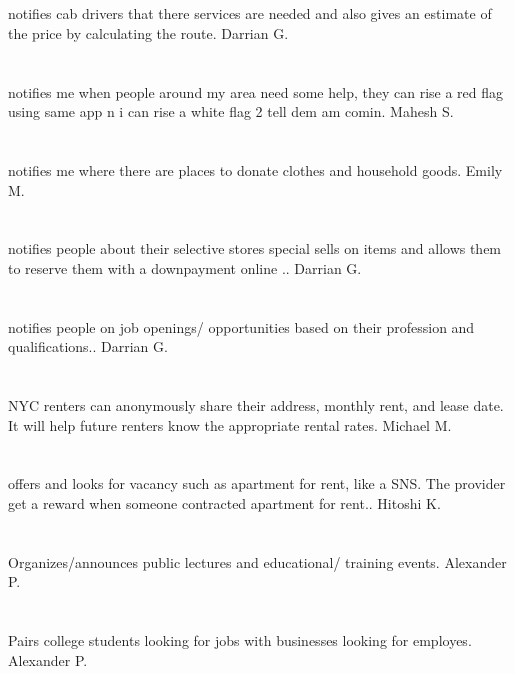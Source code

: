 \section{}notifies cab drivers that there services are needed and also gives an estimate of the price by calculating the route. Darrian G.
\section{}notifies me when people around my area need some help,  they can rise a red flag using same app n i can rise a white flag 2 tell dem am comin. Mahesh S.
\section{}notifies me where there are places to donate clothes and household goods. Emily M.
\section{}notifies people about their selective stores special sells on items and allows them to reserve them with a downpayment online .. Darrian G.
\section{}notifies people on job openings/ opportunities based on their profession and qualifications.. Darrian G.
\section{}NYC renters can anonymously share their address,  monthly rent,  and lease date. It will help future renters know the appropriate rental rates. Michael M.
\section{}offers and looks for vacancy such as apartment for rent,  like a SNS. The provider get a reward when someone contracted apartment for rent.. Hitoshi K.
\section{}Organizes/announces public lectures and educational/ training events. Alexander P.
\section{}Pairs college students looking for jobs with businesses looking for employes. Alexander P.
